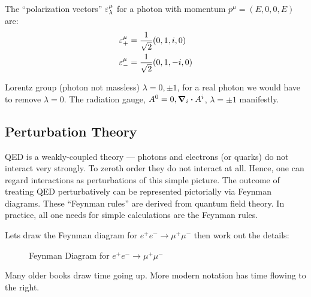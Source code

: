 The ``polarization vectors'' $\varepsilon^\mu_\lambda$ for a photon with momentum $p^\mu=(E,0,0,E)$ are:
\begin{align*}
  \varepsilon^\mu_+&=\frac1{\sqrt{2}}(0,1,i,0)\\
  \varepsilon^\mu_-&=\frac1{\sqrt{2}}(0,1,-i,0)
\end{align*}

\begin{aside}
  Lorentz group (photon not massless) $\lambda=0,\pm1$, for a real photon we would have to remove $\lambda=0$. The radiation gauge, $A^0=0, \grad_i\vdot A^i$, $\lambda=\pm1$ manifestly.
\end{aside}

\subsection{Perturbation Theory}
QED is a weakly-coupled theory --- photons and electrons (or quarks) do not interact very strongly. To zeroth order they do not interact at all. Hence, one can regard interactions as perturbations of this simple picture. The outcome of treating QED perturbatively can be represented pictorially via Feynman diagrams. These ``Feynman rules'' are derived from quantum field theory. In practice, all one needs for simple calculations are the Feynman rules.

Lets draw the Feynman diagram for $e^+e^-\to\mu^+\mu^-$ then work out the details:
\begin{figure}[H]
  \centering
  \caption{Feynman Diagram for $e^+e^-\to\mu^+\mu^-$}
\end{figure}

\begin{aside}
  Many older books draw time going up. More modern notation has time flowing to the right. 
\end{aside}

